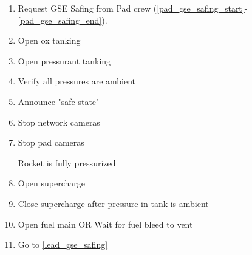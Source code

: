 \begin{enumerate}[label=L\arabic*.]
    \newpage
    \item \label{lead_gse_safing} Request GSE Safing from Pad crew (\ref{pad_gse_safing_start}-\ref{pad_gse_safing_end}).\checkbox
    \item Open ox tanking\checkbox
    \item Open pressurant tanking\checkbox
    \item Verify all pressures are ambient\checkbox
    \item Announce "safe state"\checkbox
    \item Stop network cameras\checkbox
    \item Stop pad cameras\checkbox
 
    Rocket is fully pressurized
    \item Open supercharge\checkbox
    \item Close supercharge after pressure in tank is ambient\checkbox
    \item Open fuel main OR Wait for fuel bleed to vent\checkbox
    \item Go to \ref{lead_gse_safing} \checkbox
    


    
    

\label{end_section_lead}
\end{enumerate}